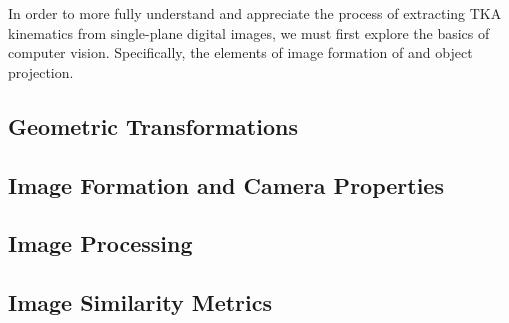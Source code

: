 In order to more fully understand and appreciate the process of extracting TKA kinematics from single-plane digital images, we must first explore the basics of computer vision. Specifically, the elements of image formation of and object projection.

\subsection{Geometric Transformations}
\label{sec:geometric-transformations}


\subsection{Image Formation and Camera Properties}
\label{sec:img-form-camera-props}


\subsection{Image Processing}
\label{sec:image-processing}


\subsection{Image Similarity Metrics}
\label{sec:image-similarity}

